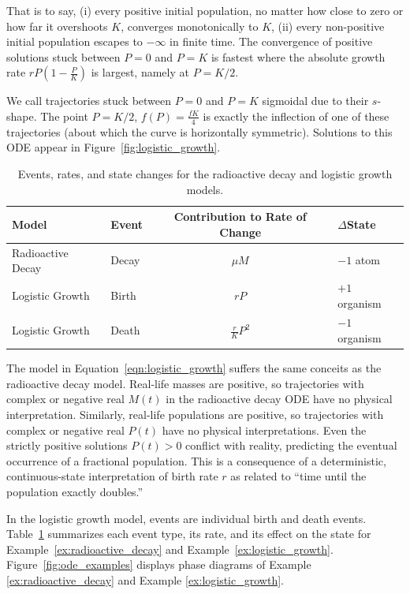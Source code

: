 \begin{example}
That is to say, (i) every positive initial population, no matter how close to zero or how far it overshoots $K$, converges monotonically to $K$, (ii) every non-positive initial population escapes to $-\infty$ in finite time. The convergence of positive solutions stuck between $P = 0$ and $P = K$ is fastest where the absolute growth rate $rP\left(1-\frac{P}{K}\right)$ is largest, namely at $P=K/2$.

We call trajectories stuck between $P = 0$ and $P = K$ sigmoidal due to their $s$-shape. The point $P=K/2$, $f(P) = \frac{fK}{4}$ is exactly the inflection of one of these trajectories (about which the curve is horizontally symmetric). Solutions to this ODE appear in Figure~\ref{fig:logistic_growth}.


\begin{table}[htbp]
\centering
\begin{tabular}{llcl}
\hline
\textbf{Model} & \textbf{Event} & \textbf{Contribution to Rate of Change} & $\Delta$\textbf{State} \\
\hline \hline
Radioactive Decay & Decay & $\mu M$ & $-1$ atom \\ \hline
Logistic Growth & Birth & $rP$ & $+1$ organism \\
Logistic Growth & Death & $\frac{r}{K}P^2$ & $-1$ organism \\
\hline
\end{tabular}
\caption{Events, rates, and state changes for the radioactive decay and logistic growth models.}
\label{tab:ode_events}
\end{table}


\end{example}

The model in Equation~\ref{eqn:logistic_growth} suffers the same conceits as the radioactive decay model. Real-life masses are positive, so trajectories with complex or negative real $M(t)$ in the radioactive decay ODE have no physical interpretation. Similarly, real-life populations are positive, so trajectories with complex or negative real  $P(t)$ have no physical interpretations. Even the strictly positive solutions $P(t) > 0$ conflict with reality, predicting the eventual occurrence of a fractional population. This is a consequence of a deterministic, continuous-state interpretation of birth rate $r$ as related to ``time until the population exactly doubles.''

In the logistic growth model, events are individual birth and death events. Table~\ref{tab:ode_events} summarizes each event type, its rate, and its effect on the state for Example~\ref{ex:radioactive_decay} and Example~\ref{ex:logistic_growth}. Figure~\ref{fig:ode_examples} displays phase diagrams of Example \ref{ex:radioactive_decay} and Example \ref{ex:logistic_growth}.



